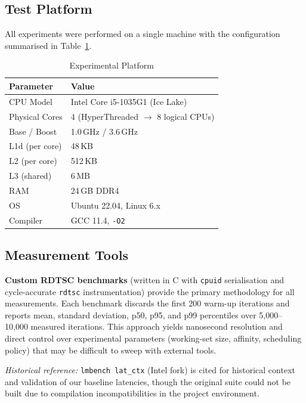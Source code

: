 \documentclass[conference]{IEEEtran}
\begin{document}
\subsection{Test Platform}

All experiments were performed on a single machine with the
configuration summarised in Table~\ref{tab:platform}.

\begin{table}[ht]
\centering
\caption{Experimental Platform}
\label{tab:platform}
\begin{tabular}{ll}
\toprule
\textbf{Parameter} & \textbf{Value} \\
\midrule
CPU Model       & Intel Core i5-1035G1 (Ice Lake) \\
Physical Cores  & 4 (HyperThreaded $\rightarrow$ 8 logical CPUs) \\
Base / Boost    & 1.0\,GHz / 3.6\,GHz \\
L1d (per core)  & 48\,KB \\
L2  (per core)  & 512\,KB \\
L3  (shared)    & 6\,MB \\
RAM             & 24\,GB DDR4 \\
OS              & Ubuntu 22.04, Linux 6.x \\
Compiler        & GCC 11.4, \texttt{-O2} \\
\bottomrule
\end{tabular}
\end{table}

\subsection{Measurement Tools}

\textbf{Custom RDTSC benchmarks} (written in C with \texttt{cpuid}
serialisation and cycle-accurate \texttt{rdtsc} instrumentation) provide the
primary methodology for all measurements.  Each benchmark discards the first
200 warm-up iterations and reports mean, standard deviation, p50, p95, and
p99 percentiles over 5,000–10,000 measured iterations.  This approach yields
nanosecond resolution and direct control over experimental parameters
(working-set size, affinity, scheduling policy) that may be difficult to
sweep with external tools.

\textit{Historical reference:} \texttt{lmbench lat\_ctx} (Intel fork) is cited
for historical context and validation of our baseline latencies, though the
original suite could not be built due to compilation incompatibilities in the
project environment.
\end{document}

